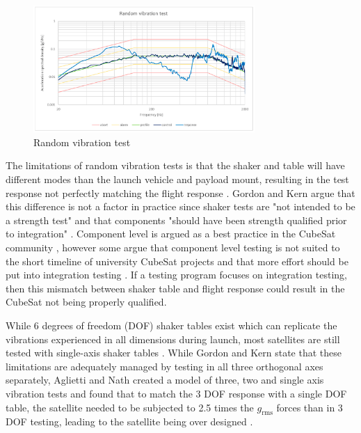 \documentclass{report}
\begin{document}
\begin{figure}[H]
  \centering
  \includegraphics[width=0.75\textwidth]{images/random-study.png}
  \caption{Random vibration test \cite{nieto2019cubesat}}
  \label{fig:random}
\end{figure}

The limitations of random vibration tests is that the shaker and table will have different modes than the launch vehicle and payload mount, resulting in the test response not perfectly matching the flight response \cite{gordon2015benefits,aglietti2019spacecraft}. Gordon and Kern argue that this difference is not a factor in practice since shaker tests are "not intended to be a strength test"  \cite[p.~7]{gordon2015benefits} and that components "should have been strength qualified prior to integration" \cite[p.~7]{gordon2015benefits}. Component level is argued as a best practice in the CubeSat community \cite{rawsonbest}, however some argue that component level testing is not suited to the short timeline of university CubeSat projects and that more effort should be put into integration testing \cite{decker2016systems}. If a testing program focuses on integration testing, then this mismatch between shaker table and flight response could result in the CubeSat not being properly qualified.

While 6 degrees of freedom (DOF) shaker tables exist which can replicate the vibrations experienced in all dimensions during launch, most satellites are still tested with single-axis shaker tables \cite{gordon2015benefits,aglietti2019spacecraft,nath2022study}. While Gordon and Kern \cite{gordon2015benefits} state that these limitations are adequately managed by testing in all three orthogonal axes separately, Aglietti and Nath \cite{nath2022study} created a model of three, two and single axis vibration tests and found that to match the 3 DOF response with a single DOF table, the satellite needed to be subjected to 2.5 times the $g_\text{rms}$ forces than in 3 DOF testing, leading to the satellite being over designed \cite{nath2022study}.
\end{document}
